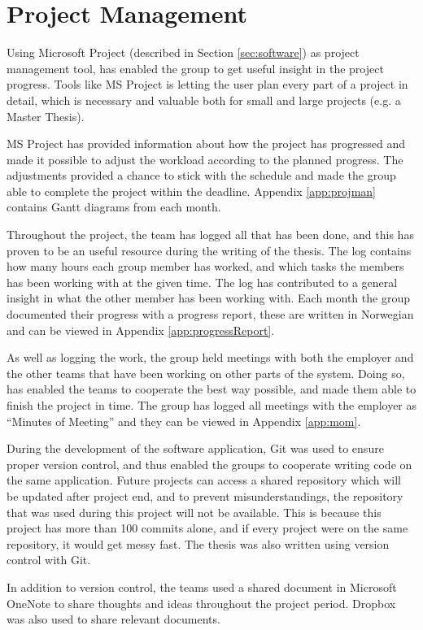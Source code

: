 \chapter{Project Management}
\label{cha:projectmanagement}
Using Microsoft Project (described in Section \ref{sec:software}) as project management tool, has enabled the group to get useful insight in the project progress. Tools like MS Project is letting the user plan every part of a project in detail, which is necessary and valuable both for small and large projects (e.g. a Master Thesis).

MS Project has provided information about how the project has progressed and made it possible to adjust the workload according to the planned progress. The adjustments provided a chance to stick with the schedule and made the group able to complete the project within the deadline. Appendix \ref{app:projman} contains Gantt diagrams from each month.

Throughout the project, the team has logged all that has been done, and this has proven to be an useful resource during the writing of the thesis. The log contains how many hours each group member has worked, and which tasks the members has been working with at the given time. The log has contributed to a general insight in what the other member has been working with. Each month the group documented their progress with a progress report, these are written in Norwegian and can be viewed in Appendix \ref{app:progressReport}.

As well as logging the work, the group held meetings with both the employer and the other teams that have been working on other parts of the system. Doing so, has enabled the teams to cooperate the best way possible, and made them able to finish the project in time. The group has logged all meetings with the employer as ``Minutes of Meeting'' and they can be viewed in Appendix \ref{app:mom}.

During the development of the software application, Git was used to ensure proper version control, and thus enabled the groups to cooperate writing code on the same application. Future projects can access a shared repository which will be updated after project end, and to prevent misunderstandings, the repository that was used during this project will not be available. This is because this project has more than 100 commits alone, and if every project were on the same repository, it would get messy  fast. The thesis was also written using version control with Git.

In addition to version control, the teams used a shared document in Microsoft OneNote to share thoughts and ideas throughout the project period. Dropbox was also used to share relevant documents.